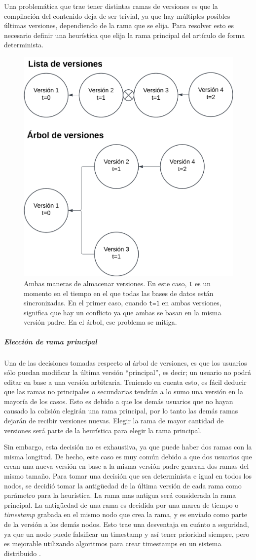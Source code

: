 Una problemática que trae tener distintas ramas de versiones es que la compilación del contenido deja de ser trivial, ya que hay múltiples posibles últimas versiones, dependiendo de la rama que se elija. Para resolver esto es necesario definir una heurística que elija la rama principal del artículo de forma determinista.

\begin{figure}[H]
    \centering
    \includegraphics[width=0.5\linewidth]{img/solucion-wiki/arbol-versiones.png}
    \caption{Ambas maneras de almacenar versiones. En este caso, \texttt{t} es un momento en el tiempo en el que todas las bases de datos están sincronizadas. En el primer caso, cuando \texttt{t=1} en ambas versiones, significa que hay un conflicto ya que ambas se basan en la misma versión padre. En el árbol, ese problema se mitiga.}
    \label{fig:usm-wiki}
\end{figure}

\subparagraph{Elección de rama principal}

Una de las decisiones tomadas respecto al árbol de versiones, es que los usuarios sólo puedan modificar la última versión “principal”, es decir; un usuario no podrá editar en base a una versión arbitraria. Teniendo en cuenta esto, es fácil deducir que las ramas no principales o secundarias tendrán a lo sumo una versión en la mayoría de los casos. Esto es debido a que los demás usuarios que no hayan causado la colisión elegirán una rama principal, por lo tanto las demás ramas dejarán de recibir versiones nuevas. Elegir la rama de mayor cantidad de versiones será parte de la heurística para elegir la rama principal.

Sin embargo, esta decisión no es exhaustiva, ya que puede haber dos ramas con la misma longitud. De hecho, este caso es muy común debido a que dos usuarios que crean una nueva versión en base a la misma versión padre generan dos ramas del mismo tamaño. Para tomar una decisión que sea determinista e igual en todos los nodos, se decidió tomar la antigüedad de la última versión de cada rama como parámetro para la heurística. La rama mas antigua será considerada la rama principal. La antigüedad de una rama es decidida por una marca de tiempo o \textit{timestamp} grabada en el mismo nodo que crea la rama, y es enviado como parte de la versión a los demás nodos. Esto trae una desventaja en cuánto a seguridad, ya que un nodo puede falsificar un timestamp y así tener prioridad siempre, pero es mejorable utilizando algoritmos para crear timestamps en un sistema distribuido \cite{distributed-timestamps}.

